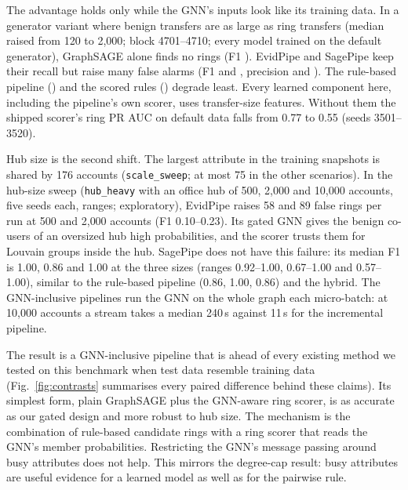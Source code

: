 The advantage holds only while the GNN's inputs look like its training data.
In a generator variant where benign transfers are as large as ring transfers
(median raised from 120 to 2{,}000; block 4701--4710; every model trained on
the default generator), GraphSAGE alone finds no rings
(F1 \EgOvFgnnunscored{}). EvidPipe and SagePipe keep their recall but raise many false
alarms (F1 \EgOvFevidpipe{} and \EgOvFsagepipe{}, precision \EgOvPevidpipe{} and
\EgOvPsagepipe{}). The rule-based pipeline (\EgOvFproposed{}) and the scored rules
(\EgOvFrules{}) degrade least. Every learned component here, including the
pipeline's own scorer, uses transfer-size features. Without them the shipped
scorer's ring PR AUC on default data falls from 0.77 to 0.55 (seeds 3501--3520).

Hub size is the second shift. The largest attribute in the training snapshots
is shared by 176 accounts (\texttt{scale\_sweep}; at most 75 in the other scenarios).
In the hub-size sweep (\texttt{hub\_heavy} with an office hub of 500, 2{,}000 and
10{,}000 accounts, five seeds each, ranges; exploratory), EvidPipe raises 58 and
89 false rings per run at 500 and 2{,}000 accounts (F1 0.10--0.23). Its
gated GNN gives the benign co-users of an oversized hub high probabilities, and
the scorer trusts them for Louvain groups inside the hub. SagePipe does not have
this failure: its median F1 is 1.00, 0.86 and 1.00 at the three sizes
(ranges 0.92--1.00, 0.67--1.00 and 0.57--1.00), similar to the rule-based
pipeline (0.86, 1.00, 0.86) and the hybrid. The GNN-inclusive pipelines run the GNN on the whole graph each micro-batch: at 10{,}000
accounts a stream takes a median 240\,s against 11\,s for the incremental
pipeline.

The result is a GNN-inclusive pipeline that is ahead of every existing method we tested
on this benchmark when test data resemble training data (Fig.~\ref{fig:contrasts}
summarises every paired difference behind these claims). Its simplest form, plain
GraphSAGE plus the GNN-aware ring scorer, is as accurate as our gated design
and more robust to hub size. The mechanism is the combination of rule-based candidate
rings with a ring scorer that reads the GNN's member probabilities. Restricting
the GNN's message passing around busy attributes does not help. This mirrors the
degree-cap result: busy attributes are useful evidence for a learned model as
well as for the pairwise rule.

